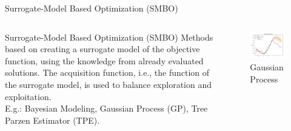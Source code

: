 \begin{frame}{Surrogate-Model Based Optimization (SMBO)}

    \begin{columns}
        \begin{column}{0.5\textwidth}
            \begin{block}{Surrogate-Model Based Optimization (SMBO)}
                Methods based on creating a surrogate model of the objective function, using the knowledge from already evaluated solutions. The acquisition function, i.e., the function of the surrogate model, is used to balance exploration and exploitation. \\
                
                E.g.: Bayesian Modeling, Gaussian Process (GP), Tree Parzen Estimator (TPE).\\
            \end{block}
        \end{column}

        \begin{column}{0.5\textwidth}
            \begin{figure}
                \centering
                \includegraphics[width=\linewidth]{imgs/plots/gaussian_process.jpg}
                \caption{Gaussian Process}
            \end{figure}
        \end{column}
    \end{columns}

\end{frame}

